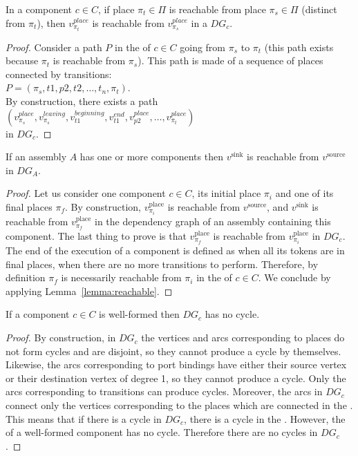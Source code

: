 \begin{lemma}
 In a component $c \in C$, if place $\pi_t \in \Pi$ is reachable from place
 $\pi_s \in \Pi$ (distinct from $\pi_t$), then $v_{\pi_t}^{place}$
 is reachable from $v_{\pi_s}^{place}$ in a $DG_c$.
 \label{lemma:reachable}
\end{lemma}

\begin{proof}
 Consider a path $P$ in the \net of $c \in C$ going from $\pi_s$ to
 $\pi_t$ (this path exists because $\pi_t$ is reachable from
 $\pi_s$). This path is made of a sequence of places connected by
 transitions:\\
 $P=(\pi_s,t1,p2,t2,\dots,t_n,\pi_t)$.\\
 By construction, there exists a path\\
 $(v_{\pi_s}^{place},v_{\pi_s}^{leaving},v_{t1}^{beginning},v_{t1}^{end},v_{p2}^{place},\dots,v_{\pi_t}^{place})$\\
 in $DG_c$.
\end{proof}


\begin{lemma}
 If an assembly $A$ has one or more components then $v^\text{sink}$ is
 reachable from $v^\text{source}$ in $DG_A$.
 \label{lemma:source_sink}
\end{lemma}

\begin{proof}
 Let us consider one component $c \in C$, its initial place $\pi_i$ and one of
 its final places $\pi_f$. By construction, $v_{\pi_i}^\text{place}$ is
 reachable from $v^\text{source}$, and $v^\text{sink}$ is reachable from
 $v_{\pi_f}^\text{place}$ in the dependency graph of an assembly containing this
 component. The last thing to prove is that $v_{\pi_f}^\text{place}$ is reachable
 from $v_{\pi_i}^\text{place}$ in $DG_c$.
 The end of the execution of a \mad component is defined as
 when all its tokens are in final places, \ie when there are no more
 transitions to perform. Therefore, by definition $\pi_f$ is
 necessarily reachable from $\pi_i$ in the \net of $c \in C$.
 We conclude by applying Lemma~\ref{lemma:reachable}.
\end{proof}

\begin{lemma}
 If a component $c \in C$ is well-formed then $DG_c$ has no cycle.
 \label{lemma:no_cycles_component}
\end{lemma}

\begin{proof}
 By construction, in $DG_c$ the vertices and arcs corresponding to places do
 not form cycles and are disjoint, so they cannot produce a cycle by themselves.
 Likewise, the arcs corresponding to port bindings have either their source
 vertex or their destination vertex of degree 1, so they cannot produce a cycle.
 Only the arcs corresponding to transitions can produce cycles. Moreover, the
 arcs in $DG_c$ connect only the vertices corresponding to the places which
 are connected in the \net. This means that if there is a cycle in $DG_c$,
 there is a cycle in the \net. However, the \net of a well-formed \mad component
 has no cycle. Therefore there are no cycles in $DG_c$.
\end{proof}

